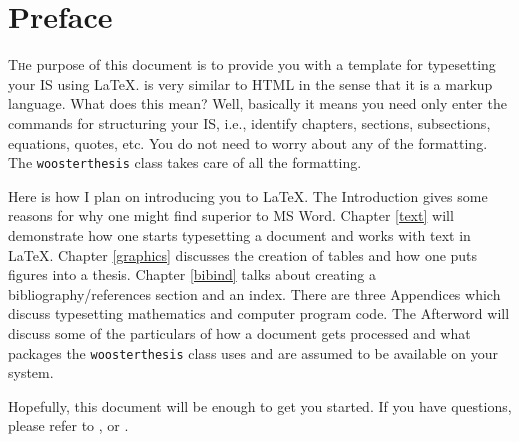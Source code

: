 
\chapter*{Preface}\label{pref}
\lettrine[lines=2, lhang=0.33, loversize=0.1]{T}he purpose of this document is to provide you with a template for typesetting your IS using \LaTeX{}. \lt is very similar to HTML in the sense that it is a markup language. What does this mean? Well, basically it means you need only enter the commands for structuring your IS, i.e., identify chapters, sections, subsections, equations, quotes, etc. You do not need to worry about any of the formatting. The  \texttt{woosterthesis} class takes care of all the formatting.

Here is how I plan on introducing you to \LaTeX. The Introduction gives some reasons for why one might find \lt superior to MS Word\texttrademark. Chapter \ref{text} will demonstrate how one starts typesetting a document and works with text in \LaTeX. Chapter \ref{graphics} discusses the creation of tables and how one puts figures into a thesis. Chapter \ref{bibind} talks about creating a bibliography/references section and an index. There are three Appendices which discuss typesetting mathematics and computer program code. The Afterword will discuss some of the particulars of how a \lt document gets processed and what packages the \texttt{woosterthesis} class uses and are assumed to be available on your system.

Hopefully, this document will be enough to get you started. If you have questions, please refer to \citet{mgbcr04,kd03,ophs03,feu02,fly03}, or \citet{gra96}.